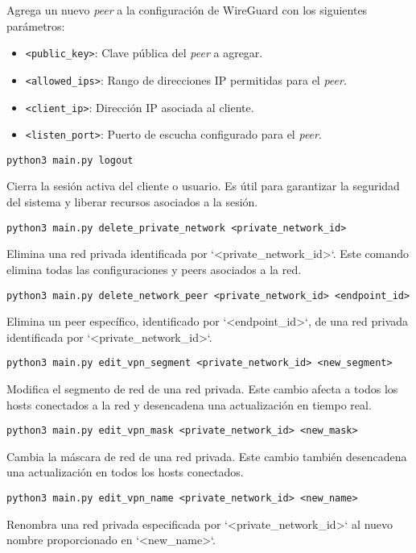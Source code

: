     Agrega un nuevo \textit{peer} a la configuración de WireGuard con los siguientes parámetros:  
        \begin{itemize}
            \item \texttt{<public\_key>}: Clave pública del \textit{peer} a agregar.
            \item \texttt{<allowed\_ips>}: Rango de direcciones IP permitidas para el \textit{peer}.
            \item \texttt{<client\_ip>}: Dirección IP asociada al cliente.
            \item \texttt{<listen\_port>}: Puerto de escucha configurado para el \textit{peer}.
        \end{itemize}
        
   
    
    \begin{Verbatim}[breaklines=true]
    python3 main.py logout
    \end{Verbatim} 
    Cierra la sesión activa del cliente o usuario. Es útil para garantizar la seguridad del sistema y liberar recursos asociados a la sesión.
    

    \begin{Verbatim}[breaklines=true]
    python3 main.py delete_private_network <private_network_id>
    \end{Verbatim} 
    Elimina una red privada identificada por `<private\_network\_id>`. Este comando elimina todas las configuraciones y peers asociados a la red.
    
    \begin{Verbatim}[breaklines=true]
    python3 main.py delete_network_peer <private_network_id> <endpoint_id>
    \end{Verbatim} 
    Elimina un peer específico, identificado por `<endpoint\_id>`, de una red privada identificada por `<private\_network\_id>`.
    
    
    \begin{Verbatim}[breaklines=true]
    python3 main.py edit_vpn_segment <private_network_id> <new_segment>
    \end{Verbatim} 
    Modifica el segmento de red de una red privada. Este cambio afecta a todos los hosts conectados a la red y desencadena una actualización en tiempo real.
    
    \begin{Verbatim}[breaklines=true]
    python3 main.py edit_vpn_mask <private_network_id> <new_mask>
    \end{Verbatim} 
    Cambia la máscara de red de una red privada. Este cambio también desencadena una actualización en todos los hosts conectados.
    
    \begin{Verbatim}[breaklines=true]
    python3 main.py edit_vpn_name <private_network_id> <new_name>
    \end{Verbatim} 
    Renombra una red privada especificada por `<private\_network\_id>` al nuevo nombre proporcionado en `<new\_name>`.
